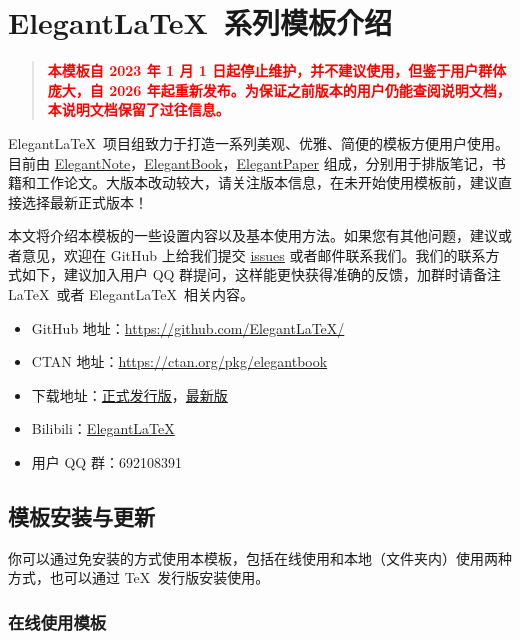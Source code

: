 \chapter{Elegant\LaTeX\ 系列模板介绍}

\begin{quotation}
  \textbf{\textcolor{red}{本模板自 2023 年 1 月 1 日起停止维护，并不建议使用，但鉴于用户群体庞大，自 2026 年起重新发布。为保证之前版本的用户仍能查阅说明文档，本说明文档保留了过往信息。}}
\end{quotation}

Elegant\LaTeX\ 项目组致力于打造一系列美观、优雅、简便的模板方便用户使用。目前由 \href{https://github.com/ElegantLaTeX/ElegantNote}{ElegantNote}，\href{https://github.com/ElegantLaTeX/ElegantBook}{ElegantBook}，\href{https://github.com/ElegantLaTeX/ElegantPaper}{ElegantPaper} 组成，分别用于排版笔记，书籍和工作论文。大版本改动较大，请关注版本信息，在未开始使用模板前，建议直接选择最新正式版本！


本文将介绍本模板的一些设置内容以及基本使用方法。如果您有其他问题，建议或者意见，欢迎在 GitHub 上给我们提交 \href{https://github.com/ElegantLaTeX/ElegantBook/issues}{issues} 或者邮件联系我们。我们的联系方式如下，建议加入用户 QQ 群提问，这样能更快获得准确的反馈，加群时请备注 \LaTeX\ 或者 Elegant\LaTeX\ 相关内容。
\begin{itemize}
  \item GitHub 地址：\href{https://github.com/ElegantLaTeX/}{https://github.com/ElegantLaTeX/}
  \item CTAN 地址：\href{https://ctan.org/pkg/elegantbook}{https://ctan.org/pkg/elegantbook}
  \item 下载地址：\href{https://github.com/ElegantLaTeX/ElegantBook/releases}{正式发行版}，\href{https://github.com/ElegantLaTeX/ElegantBook/archive/master.zip}{最新版}
  \item Bilibili：\href{https://space.bilibili.com/516479629}{ElegantLaTeX}
  \item 用户 QQ 群：692108391
\end{itemize}


\section{模板安装与更新}

你可以通过免安装的方式使用本模板，包括在线使用和本地（文件夹内）使用两种方式，也可以通过 \TeX\ 发行版安装使用。

\subsection{在线使用模板}

